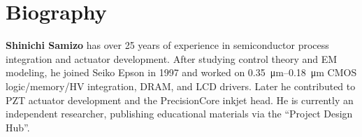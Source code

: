 \documentclass[conference]{IEEEtran}
\begin{document}
\section*{Biography}
\noindent
\textbf{Shinichi Samizo} has over 25 years of experience in semiconductor process integration and actuator development.
After studying control theory and EM modeling, he joined Seiko Epson in 1997 and worked on \SI{0.35}{\micro m}--\SI{0.18}{\micro m} CMOS logic/memory/HV integration, DRAM, and LCD drivers.
Later he contributed to PZT actuator development and the PrecisionCore inkjet head.
He is currently an independent researcher, publishing educational materials via the ``Project Design Hub''.
\end{document}

